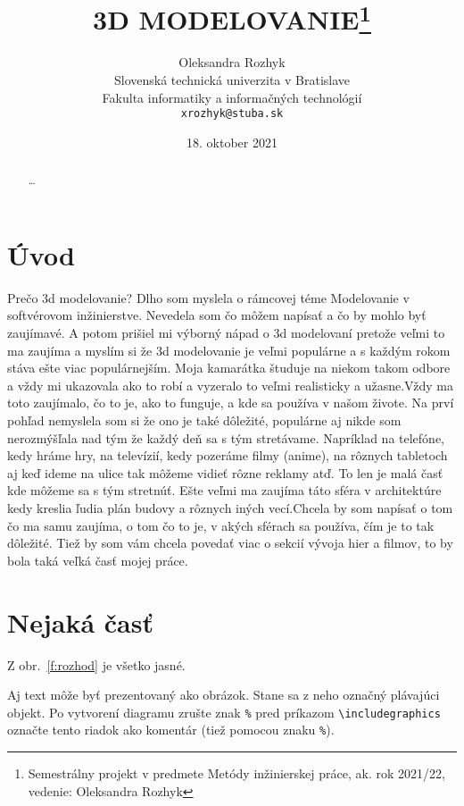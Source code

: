 \documentclass[10pt,twoside,slovak,a4paper]{article}
\title{3D MODELOVANIE\thanks{Semestrálny projekt v predmete Metódy inžinierskej práce, ak. rok 2021/22, vedenie: Oleksandra Rozhyk}} %
\author{Oleksandra Rozhyk\\[2pt]
	{\small Slovenská technická univerzita v Bratislave}\\
	{\small Fakulta informatiky a informačných technológií}\\
	{\small \texttt{xrozhyk@stuba.sk}}
	}
\date{\small 18. oktober 2021} %
\begin{document}
\maketitle

\begin{abstract}
\ldots
\end{abstract}



\section{Úvod}

Prečo 3d modelovanie?
Dlho som myslela o rámcovej téme Modelovanie v softvérovom inžinierstve. Nevedela som čo môžem napísať a čo by mohlo byť zaujímavé. A potom prišiel mi výborný nápad o 3d modelovaní pretože veľmi to ma zaujíma a myslím si že 3d modelovanie je veľmi populárne a s každým rokom stáva ešte viac populárnejším. Moja kamarátka študuje na niekom takom odbore a vždy mi ukazovala ako to robí a vyzeralo to veľmi realisticky a užasne.Vždy ma toto zaujímalo, čo to je, ako to funguje, a kde sa používa v našom živote. Na prví pohľad nemyslela som si že ono je také dôležité, populárne aj nikde som nerozmýšľala nad tým že každý deň sa s tým stretávame. Napríklad na telefóne, kedy hráme hry, na televízií, kedy pozeráme filmy (anime), na rôznych tabletoch aj keď ideme na ulice tak môžeme vidieť rôzne reklamy atď. To len je malá časť kde môžeme sa s tým stretnúť. Ešte veľmi ma zaujíma táto sféra v architektúre kedy kreslia ľudia plán budovy a rôznych iných vecí.Chcela by som napísať o tom čo ma samu zaujíma, o tom čo to je, v akých sférach sa používa, čím je to tak dôležité. Tiež by som vám chcela povedať viac o sekcií vývoja hier a filmov, to by bola taká veľká časť mojej práce.


\section{Nejaká časť} \label{nejaka}

Z obr.~\ref{f:rozhod} je všetko jasné.

\begin{figure*}[tbh]
\centering
Aj text môže byť prezentovaný ako obrázok. Stane sa z neho označný plávajúci objekt. Po vytvorení diagramu zrušte znak \texttt{\%} pred príkazom \verb|\includegraphics| označte tento riadok ako komentár (tiež pomocou znaku \texttt{\%}).
\caption{Rozhodujúci argument.}
\label{f:rozhod}
\end{figure*}
\end{document}
